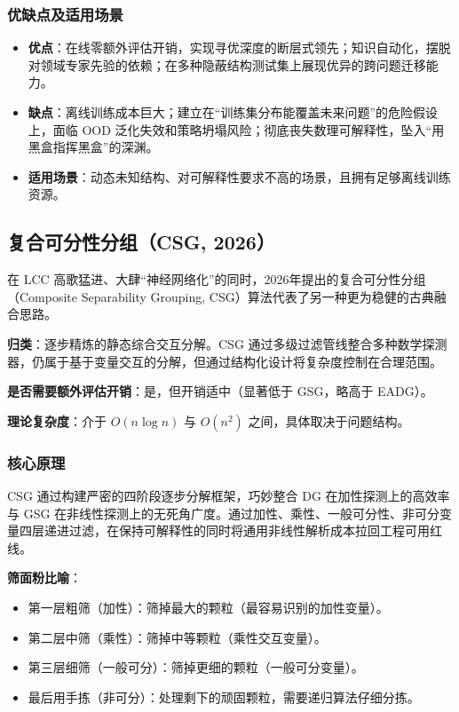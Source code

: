 \subsubsection*{优缺点及适用场景}
\begin{itemize}
    \item \textbf{优点}：在线零额外评估开销，实现寻优深度的断层式领先；知识自动化，摆脱对领域专家先验的依赖；在多种隐蔽结构测试集上展现优异的跨问题迁移能力。
    \item \textbf{缺点}：离线训练成本巨大；建立在“训练集分布能覆盖未来问题”的危险假设上，面临 OOD 泛化失效和策略坍塌风险；彻底丧失数理可解释性，坠入“用黑盒指挥黑盒”的深渊。
    \item \textbf{适用场景}：动态未知结构、对可解释性要求不高的场景，且拥有足够离线训练资源。
\end{itemize}

\subsection{复合可分性分组（CSG, 2026）}
在 LCC 高歌猛进、大肆“神经网络化”的同时，2026年提出的复合可分性分组（Composite Separability Grouping, CSG）算法代表了另一种更为稳健的古典融合思路。

\textbf{归类}：逐步精炼的静态综合交互分解。CSG 通过多级过滤管线整合多种数学探测器，仍属于基于变量交互的分解，但通过结构化设计将复杂度控制在合理范围。

\textbf{是否需要额外评估开销}：是，但开销适中（显著低于 GSG，略高于 EADG）。

\textbf{理论复杂度}：介于 $O(n \log n)$ 与 $O(n^2)$ 之间，具体取决于问题结构。

\subsubsection*{核心原理}
CSG 通过构建严密的四阶段逐步分解框架，巧妙整合 DG 在加性探测上的高效率与 GSG 在非线性探测上的无死角广度。通过加性、乘性、一般可分性、非可分变量四层递进过滤，在保持可解释性的同时将通用非线性解析成本拉回工程可用红线。

\textbf{筛面粉比喻}：
\begin{itemize}
    \item 第一层粗筛（加性）：筛掉最大的颗粒（最容易识别的加性变量）。
    \item 第二层中筛（乘性）：筛掉中等颗粒（乘性交互变量）。
    \item 第三层细筛（一般可分）：筛掉更细的颗粒（一般可分变量）。
    \item 最后用手拣（非可分）：处理剩下的顽固颗粒，需要递归算法仔细分拣。
\end{itemize}

